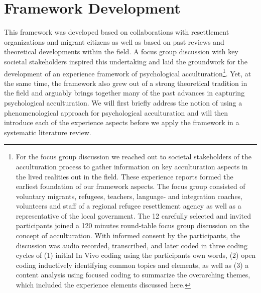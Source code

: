 \documentclass[man, 12pt, a4paper, mask]{apa7}
\begin{document}
\section{Framework Development} 
This framework was developed based on collaborations with resettlement organizations and migrant citizens as well as based on past reviews and theoretical developments within the field. A focus group discussion with key societal stakeholders inspired this undertaking and laid the groundwork for the development of an experience framework of psychological acculturation\footnote{For the focus group discussion we reached out to societal stakeholders of the acculturation process to gather information on key acculturation aspects in the lived realities out in the field. These experience reports formed the earliest foundation of our framework aspects. The focus group consisted of voluntary migrants, refugees, teachers, language- and integration coaches, volunteers and staff of a regional refugee resettlement agency as well as a representative of the local government. The 12 carefully selected and invited participants joined a 120 minutes round-table focus group discussion on the concept of acculturation. With informed consent by the participants, the discussion was audio recorded, transcribed, and later coded in three coding cycles of (1) initial In Vivo coding using the participants own words, (2) open coding inductively identifying common topics and elements, as well as (3) a content analysis using focused coding to summarize the overarching themes, which included the experience elements discussed here.}. Yet, at the same time, the framework also grew out of a strong theoretical tradition in the field and arguably brings together many of the past advances in capturing psychological acculturation. We will first briefly address the notion of using a phenomenological approach for psychological acculturation and will then introduce each of the experience aspects before we apply the framework in a systematic literature review.
\end{document}

